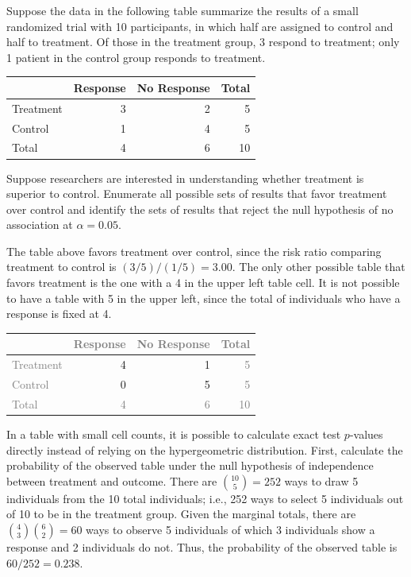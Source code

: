 \begin{examplewrap}
	\begin{nexample}{Suppose the data in the following table summarize the results of a small randomized trial with 10 participants, in which half are assigned to control and half to treatment. Of those in the treatment group, 3 respond to treatment; only 1 patient in the control group responds to treatment.
			\vspace{0.2cm}

			\centering
			\begin{tabular}{l rr |r}
				\hline
				 & Response & No Response & Total \\
				\hline
				Treatment &  3 & 2 & 5    \\
				Control & 1 & 4 &  5    \\
				\hline
				Total & 4 & 6 & 10 \\
				\hline
			\end{tabular}
			\flushleft

			\vspace{0.1cm}

			Suppose researchers are interested in understanding whether treatment is superior to control. Enumerate all possible sets of results that favor treatment over control and identify the sets of results that reject the null hypothesis of no association at $\alpha = 0.05$.}\label{ex:fisherTestSmallSample}

		The table above favors treatment over control, since the risk ratio comparing treatment to control is $(3/5)/(1/5) = 3.00$. The only other possible table that favors treatment is the one with a 4 in the upper left table cell. It is not possible to have a table with 5 in the upper left, since the total of individuals who have a response is fixed at 4.

		\centering
		\begin{tabular}{l rr |r}
			\hline
			& \textcolor{gray}{Response} & \textcolor{gray}{No Response} & \textcolor{gray}{Total} \\
			\hline
			\textcolor{gray}{Treatment} &  4 & 1 & \textcolor{gray}{5}    \\
			\textcolor{gray}{Control} & 0 & 5 &  \textcolor{gray}{5}    \\
			\hline
			\textcolor{gray}{Total} & \textcolor{gray}{4} & \textcolor{gray}{6} & \textcolor{gray}{10} \\
			\hline
		\end{tabular}
		\flushleft

		In a table with small cell counts, it is possible to calculate exact test $p$-values directly instead of relying on the hypergeometric distribution. First, calculate the probability of the observed table under the null hypothesis of independence between treatment and outcome. There are ${10 \choose 5} = 252$ ways to draw 5 individuals from the 10 total individuals; i.e., 252 ways to select 5 individuals out of 10 to be in the treatment group. Given the marginal totals, there are  ${4 \choose 3} {6 \choose 2} = 60$ ways to observe 5 individuals of which 3 individuals show a response and 2 individuals do not. Thus, the probability of the observed table is $60/252 = 0.238$.


\end{nexample}
\end{examplewrap}
